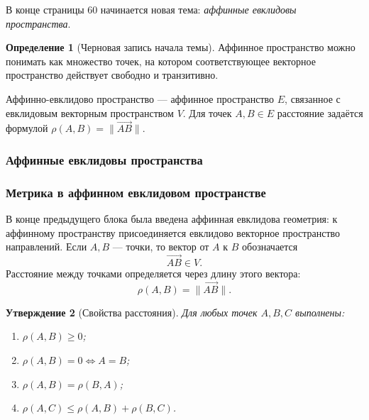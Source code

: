 \documentclass[12pt,a4paper]{article}
\theoremstyle{definition}
\newtheorem{definition}{Определение}[section]
\theoremstyle{plain}
\newtheorem{proposition}[definition]{Утверждение}
\theoremstyle{remark}
\newenvironment{knowledgefix}{\begin{clarifybox}}{\end{clarifybox}}
\begin{document}
В конце страницы 60 начинается новая тема: \emph{аффинные евклидовы пространства}.

\begin{definition}[Черновая запись начала темы]
Аффинное пространство можно понимать как множество точек, на котором соответствующее векторное пространство действует свободно и транзитивно.
\begin{knowledgefix}
Аффинно-евклидово пространство — аффинное пространство \(E\), связанное с евклидовым векторным пространством \(V\). Для точек \(A,B\in E\) расстояние задаётся формулой \(\rho(A,B)=\|\overrightarrow{AB}\|\).
\end{knowledgefix}
\end{definition}



\subsubsection{Аффинные евклидовы пространства}

\subsubsection*{Метрика в аффинном евклидовом пространстве}

В конце предыдущего блока была введена аффинная евклидова геометрия: к аффинному пространству присоединяется евклидово векторное пространство направлений. Если $A,B$ --- точки, то вектор от $A$ к $B$ обозначается
\[
    \overrightarrow{AB}\in V.
\]
Расстояние между точками определяется через длину этого вектора:
\[
    \rho(A,B)=\lVert \overrightarrow{AB}\rVert.
\]

\begin{proposition}[Свойства расстояния]
Для любых точек $A,B,C$ выполнены:
\begin{enumerate}[label=\arabic*)]
    \item $\rho(A,B)\ge 0$;
    \item $\rho(A,B)=0 \Longleftrightarrow A=B$;
    \item $\rho(A,B)=\rho(B,A)$;
    \item $\rho(A,C)\le \rho(A,B)+\rho(B,C)$.
\end{enumerate}
\end{proposition}
\end{document}

